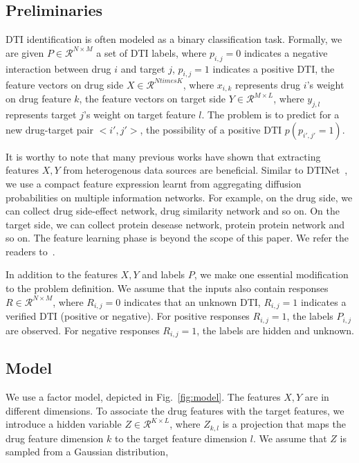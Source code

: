 \documentclass[sigconf,anonymous]{acmart}
\begin{document}
\subsection{Preliminaries}\label{sec:input}
DTI identification is often modeled as a binary classification task. Formally, we are given $P\in \mathcal{R}^{N\times M}$ a set of DTI labels, where $p_{i,j}=0$ indicates a negative interaction between drug $i$ and target $j$, $p_{i,j}=1$ indicates a positive DTI, the feature vectors on drug side $X\in \mathcal{R}^{N times K}$, where $x_{i,k}$ represents drug $i$'s weight on drug feature $k$, the feature vectors on target side $Y\in \mathcal{R}^{M \times L}$, where $y_{j,l}$ represents target $j$'s weight on target feature $l$. The problem is to predict for a new drug-target pair $<i',j'>$, the possibility of a positive DTI $p(p_{i',j'}=1)$.  

It is worthy to note that many previous works have shown that extracting features $X,Y$ from heterogenous data sources are beneficial. Similar to DTINet~\cite{Luo2017Network}, we use a compact feature expression learnt from aggregating diffusion probabilities on multiple information networks. For example, on the drug side, we can collect drug side-effect network, drug similarity network and so on. On the target side, we can collect protein desease network, protein protein network and so on. The feature learning phase is beyond the scope of this paper. We refer the readers to~\cite{Luo2017Network}.

In addition to the features $X,Y$ and labels $P$, we make one essential modification to the problem definition. We assume that the inputs also contain responses $R\in \mathcal{R}^{N\times M}$, where $R_{i,j}=0$ indicates that an unknown DTI, $R_{i,j}=1$ indicates a verified DTI (positive or negative). For positive responses $R_{i,j}=1$, the labels $P_{i,j}$ are observed. For negative responses $R_{i,j}=1$, the labels are hidden and unknown. 

\subsection{Model}\label{sec:model}

We use a factor model, depicted in Fig.~\ref{fig:model}. The features $X,Y$ are in different dimensions. To associate the drug features with the target features, we introduce a hidden variable $Z\in\mathcal{R}^{K\times L}$, where $Z_{k,l}$ is a projection that maps the drug feature dimension $k$ to the target feature dimension $l$. We assume that $Z$ is sampled from a Gaussian distribution, 
\end{document}
